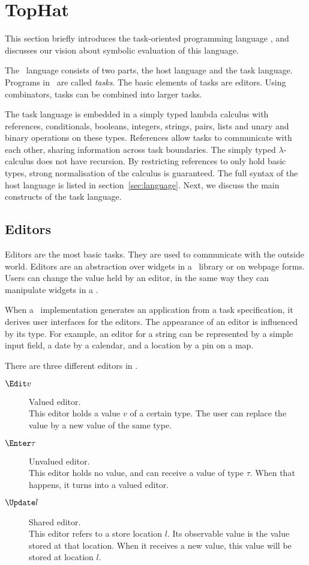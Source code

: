 
\section{TopHat}
\label{sec:intuition}

This section briefly introduces the task-oriented programming language \TOPHAT,
and discusses our vision about symbolic evaluation of this language.

The \TOPHAT\ language consists of two parts, the host language and the task language.
Programs in \TOPHAT\ are called \emph{tasks}.
The basic elements of tasks are editors.
Using combinators, tasks can be combined into larger tasks.

The task language is embedded in a simply typed lambda calculus with references, conditionals, booleans, integers, strings, pairs, lists and unary and binary operations on these types.
References allow tasks to communicate with each other, sharing information across task boundaries.
The simply typed $\lambda$-calculus does not have recursion.
By restricting references to only hold basic types,
strong normalisation of the calculus is guaranteed.
The full syntax of the host language is listed in section~\ref{sec:language}.
Next, we discuss the main constructs of the task language.


\subsection{Editors}

Editors are the most basic tasks.
They are used to communicate with the outside world.
Editors are an abstraction over widgets in a \GUI\ library or on webpage forms.
Users can change the value held by an editor, in the same way they can manipulate widgets in a \GUI.

When a \TOP\ implementation generates an application from a task specification, it derives user interfaces for the editors.
The appearance of an editor is influenced by its type.
For example, an editor for a string can be represented by a simple input field, a date by a calendar, and a location by a pin on a map.

There are three different editors in \TOPHAT.
\begin{description}
  \item[$\Edit v$] Valued editor.\\
    This editor holds a value $v$ of a certain type.
    The user can replace the value by a new value of the same type.
  \item[$\Enter \tau$] Unvalued editor.\\
    This editor holds no value, and can receive a value of type $\tau$.
    When that happens, it turns into a valued editor.
  \item[$\Update l$] Shared editor.\\
    This editor refers to a store location $l$.
    Its observable value is the value stored at that location.
    When it receives a new value, this value will be stored at location $l$.
\end{description}



